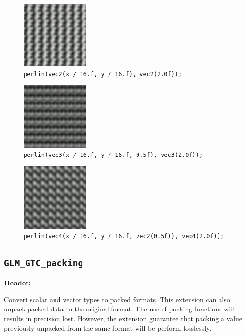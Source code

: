 \documentclass{scrartcl}
\numberwithin{figure}{subsection}
\begin{document}
\begin{figure}
  \centering
  \includegraphics[width=0.3\textwidth]{perlin4}
  \cprotect\caption{\verb|perlin(vec2(x / 16.f, y / 16.f), vec2(2.0f));|}
\end{figure}

\begin{figure}
  \centering
  \includegraphics[width=0.3\textwidth]{perlin5}
  \cprotect\caption{\verb|perlin(vec3(x / 16.f, y / 16.f, 0.5f), vec3(2.0f));|}
\end{figure}

\begin{figure}
  \centering
  \includegraphics[width=0.3\textwidth]{perlin6}
  \cprotect\caption{\verb|perlin(vec4(x / 16.f, y / 16.f, vec2(0.5f)), vec4(2.0f));|}
\end{figure}

\subsection{\texttt{GLM\_GTC\_packing}}
\textbf{Header:} 

Convert scalar and vector types to packed formats. This extension can also unpack packed data to the original format. The use of packing functions will results in precision lost. However, the extension guarantee that packing a value previously unpacked from the same format will be perform losslessly.
\end{document}
